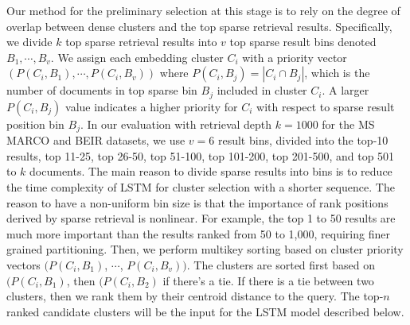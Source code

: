 Our method   for the preliminary selection at this stage is to rely on
the degree of overlap between dense clusters and the top sparse retrieval results. 
Specifically, we divide $k$ top sparse retrieval results into $v$ top sparse result bins denoted $B_1, \cdots, B_v$.  
We  assign each embedding cluster $C_i$ with a priority vector $(P(C_i, B_1), \cdots, P(C_i, B_v))$ where
$P(C_i, B_j)=  |C_i  \cap  B_j|$,
which is the number of documents in top sparse bin $B_j$ included in cluster $C_i$.
A larger $P(C_i, B_j)$ value indicates a higher priority for $C_i$ with respect to sparse result position bin $B_j$.
In our evaluation with  retrieval depth $k = 1000$ for the MS MARCO and BEIR datasets,
we use $v=6$ result bins, divided into the top-10 results, top 11-25, top 26-50, top 51-100, top 101-200, top 201-500, and top 501 to $k$ documents.
The main reason to divide sparse results into bins is to reduce the time complexity of LSTM for cluster selection with 
a shorter sequence. The reason to have a non-uniform bin size is that the importance of rank positions derived by sparse 
retrieval is nonlinear. For example, the top 1 to 50 results are much more important than the results 
ranked from 50 to 1,000, requiring finer grained partitioning.
Then, we perform multikey sorting based on cluster priority vectors $(P(C_i, B_1)$, $\cdots$, $P(C_i, B_v))$. The clusters are sorted first based on $(P(C_i, B_1)$, then $(P(C_i, B_2)$ if there's a tie. 
If there is a tie between two clusters, then we rank them by their centroid distance to the query.
The top-$n$ ranked candidate clusters will be  the  input for the LSTM model described below.

